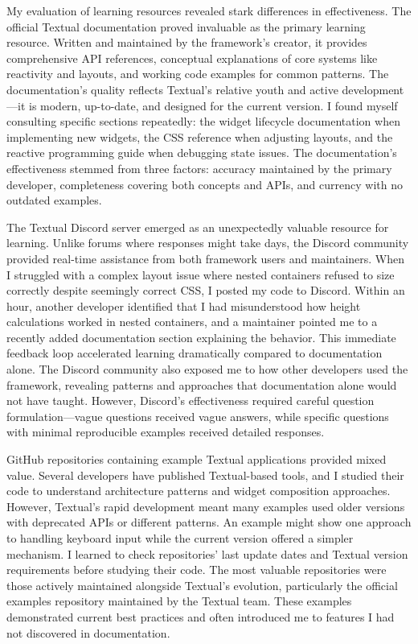 \documentclass[12pt,a4paper]{article}
\begin{document}
My evaluation of learning resources revealed stark differences in effectiveness. The official Textual documentation proved invaluable as the primary learning resource. Written and maintained by the framework's creator, it provides comprehensive API references, conceptual explanations of core systems like reactivity and layouts, and working code examples for common patterns. The documentation's quality reflects Textual's relative youth and active development—it is modern, up-to-date, and designed for the current version. I found myself consulting specific sections repeatedly: the widget lifecycle documentation when implementing new widgets, the CSS reference when adjusting layouts, and the reactive programming guide when debugging state issues. The documentation's effectiveness stemmed from three factors: accuracy maintained by the primary developer, completeness covering both concepts and APIs, and currency with no outdated examples.

The Textual Discord server emerged as an unexpectedly valuable resource for learning. Unlike forums where responses might take days, the Discord community provided real-time assistance from both framework users and maintainers. When I struggled with a complex layout issue where nested containers refused to size correctly despite seemingly correct CSS, I posted my code to Discord. Within an hour, another developer identified that I had misunderstood how height calculations worked in nested containers, and a maintainer pointed me to a recently added documentation section explaining the behavior. This immediate feedback loop accelerated learning dramatically compared to documentation alone. The Discord community also exposed me to how other developers used the framework, revealing patterns and approaches that documentation alone would not have taught. However, Discord's effectiveness required careful question formulation—vague questions received vague answers, while specific questions with minimal reproducible examples received detailed responses.

GitHub repositories containing example Textual applications provided mixed value. Several developers have published Textual-based tools, and I studied their code to understand architecture patterns and widget composition approaches. However, Textual's rapid development meant many examples used older versions with deprecated APIs or different patterns. An example might show one approach to handling keyboard input while the current version offered a simpler mechanism. I learned to check repositories' last update dates and Textual version requirements before studying their code. The most valuable repositories were those actively maintained alongside Textual's evolution, particularly the official examples repository maintained by the Textual team. These examples demonstrated current best practices and often introduced me to features I had not discovered in documentation.
\end{document}
